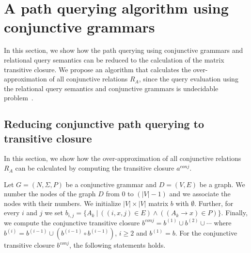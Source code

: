 \section{A path querying algorithm using conjunctive grammars}
In this section, we show how the path querying using conjunctive grammars and relational query semantics can be reduced to the calculation of the matrix transitive closure. We propose an algorithm that calculates the over-approximation of all conjunctive relations $R_A$, since the query evaluation using the relational query semantics and conjunctive grammars is undecidable problem~\cite{hellingsRelational}.

\subsection{Reducing conjunctive path querying to transitive closure} \label{section_reducing_conj}
In this section, we show how the over-approximation of all conjunctive relations $R_A$ can be calculated by computing the transitive closure $a^{conj}$.

Let $G = (N,\Sigma,P)$ be a conjunctive grammar and $D = (V, E)$ be a graph. We number the nodes of the graph $D$ from 0 to $(|V| - 1)$ and we associate the nodes with their numbers. We initialize $|V| \times |V|$ matrix $b$ with $\emptyset$. Further, for every $i$ and $j$ we set $b_{i,j} = \{A_k~|~((i,x,j) \in E) \wedge ((A_k \rightarrow x) \in P)\}$. Finally, we compute the conjunctive transitive closure $b^{conj} = b^{(1)} \cup b^{(2)} \cup \cdots$ where $b^{(i)} = b^{(i-1)} \cup (b^{(i-1)} \circ b^{(i-1)})$, $i \ge 2$ and $b^{(1)} = b$. For the conjunctive transitive closure $b^{conj}$, the following statements holds.

